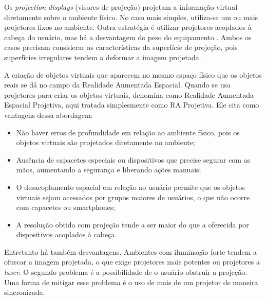 
Os \textit{projection displays} (visores de projeção) projetam a informação virtual diretamente sobre o ambiente físico. No caso mais simples, utiliza-se um ou mais projetores fixos no ambiente. Outra estratégia é utilizar projetores acoplados à cabeça do usuário, mas há a desvantagem do peso do equipamento \cite{azuma_recent_2001}. Ambos os casos precisam considerar as características da superfície de projeção, pois superfícies irregulares tendem a deformar a imagem projetada.

A criação de objetos virtuais que aparecem no mesmo espaço físico que os objetos reais se dá no campo da Realidade Aumentada Espacial. Quando se usa projetores para criar os objetos virtuais,  denomina como Realidade Aumentada Espacial Projetiva, aqui tratada simplesmente como RA Projetiva. Ele cita como vantagens dessa abordagem:
\begin{itemize}
    \item Não haver erros de profundidade em relação ao ambiente físico, pois os objetos virtuais são projetados diretamente no ambiente;
    \item Ausência de capacetes especiais ou dispositivos que precise segurar com as mãos, aumentando a segurança e liberando ações manuais;
    \item O desacoplamento espacial em relação ao usuário permite que os objetos virtuais sejam acessados por grupos maiores de usuários, o que não ocorre com capacetes ou smartphones;
    \item A resolução obtida com projeção tende a ser maior do que a oferecida por dispositivos acoplados à cabeça.
\end{itemize}

Entretanto há também desvantagens. Ambientes com iluminação forte tendem a ofuscar a imagem projetada, o que exige projetores mais potentes ou projetores a \textit{laser}. O segundo problema é a possibilidade de o usuário obstruir a projeção. Uma forma de mitigar esse problema é o uso de mais de um projetor de maneira sincronizada.

